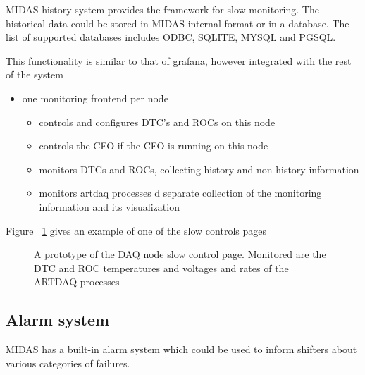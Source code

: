 MIDAS history system provides the framework for slow monitoring.
The historical data could be stored in  MIDAS internal format or in a database.
The list of supported databases includes ODBC, SQLITE, MYSQL and PGSQL.

This functionality is similar to that of grafana, however integrated with the
rest of the system

\begin{itemize}
\item
  one monitoring frontend per node 
  \begin{itemize}
  \item
    controls and configures DTC's and ROCs on this node
  \item
    controls the CFO if the CFO is running on this node
  \item
    monitors DTCs and ROCs, collecting history and non-history information
  \item
    monitors artdaq processes d separate collection of the monitoring information and its visualization
  \end{itemize}
\end{itemize}

Figure ~\ref{figure:slow_controls_node_page} gives an example of one of the slow controls pages

\begin{figure}[H]
  \caption{
    \label{figure:slow_controls_node_page}
    A prototype of the DAQ node slow control page. Monitored are the DTC and ROC temperatures and voltages
    and rates of the ARTDAQ processes
  }
\end{figure}


\subsection{Alarm system}

MIDAS has a built-in alarm system which could be used to inform shifters
about various categories of failures.


